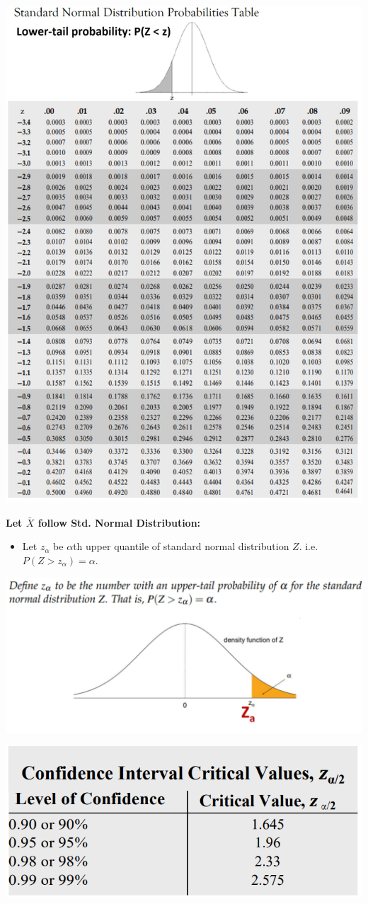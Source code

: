 \documentclass[12pt, landscape]{article}
\begin{document}
\begin{multicols*}{3}
\vfill \null
\columnbreak

\centerline{\includegraphics[width=0.98\linewidth]{criticals}} 
\textbf{Let $\bar{X}$ follow Std. Normal Distribution:} \\
\begin{itemize}
    \item Let $z_\alpha$ be $\alpha$th upper quantile of standard normal distribution 
    $Z$. i.e. $P(Z > z_\alpha) = \alpha$.
\end{itemize}  
\smallskip
\centerline{\includegraphics[width=0.6\linewidth]{Za}}
\centerline{\includegraphics[width=0.5\linewidth]{criticalvalues}}

\end{multicols*}
\end{document}
